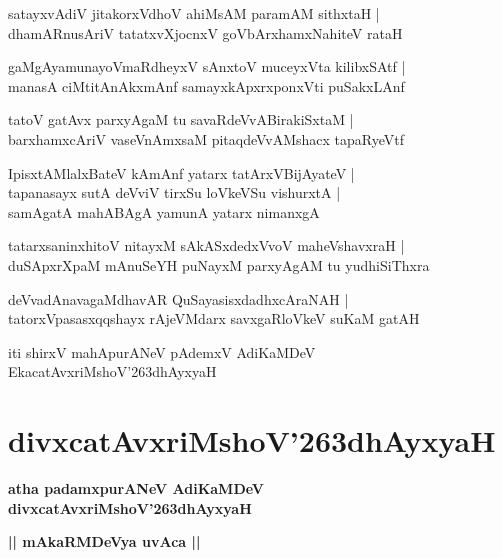 \documentclass[twoside,12pt,openright]{book}
\def\S{\char'263}
\newcounter{shloka}[chapter]
\def\uvaca#1{\centerline{{\large\textbf{#1}}}}
\begin{document}
\begin{shloka}
satayxvAdiV jitakorxVdhoV ahiMsAM paramAM sithxtaH |\\
dhamARnusAriV tatatxvXjocnxV goVbArxhamxNahiteV rataH 
\end{shloka}

\begin{shloka}
gaMgAyamunayoVmaRdheyxV sAnxtoV muceyxVta kilibxSAtf |\\
manasA ciMtitAnAkxmAnf samayxkApxrxponxVti puSakxLAnf 
\end{shloka}

\begin{shloka}
tatoV gatAvx parxyAgaM tu savaRdeVvABirakiSxtaM |\\
barxhamxcAriV vaseVnAmxsaM pitaqdeVvAMshacx tapaRyeVtf 
\end{shloka}

\begin{shloka}
IpisxtAMlalxBateV kAmAnf yatarx tatArxVBijAyateV |\\
tapanasayx sutA deVviV tirxSu loVkeVSu vishurxtA |\\
samAgatA mahABAgA yamunA yatarx nimanxgA 
\end{shloka}

\begin{shloka}
tatarxsaninxhitoV nitayxM sAkASxdedxVvoV maheVshavxraH |\\
duSApxrXpaM mAnuSeYH  puNayxM parxyAgAM tu yudhiSiThxra
\end{shloka}

\begin{shloka}
deVvadAnavagaMdhavAR QuSayasisxdadhxcAraNAH |\\
tatorxVpasasxqqshayx rAjeVMdarx savxgaRloVkeV suKaM gatAH 
\end{shloka}

\begin{center}
iti shirxV mahApurANeV pAdemxV AdiKaMDeV EkacatAvxriMshoV\S dhAyxyaH 
\end{center}

\chapter{divxcatAvxriMshoV\S dhAyxyaH}

\begin{center}
{\LARGE\bfseries atha padamxpurANeV AdiKaMDeV divxcatAvxriMshoV\S dhAyxyaH}
\end{center}

\uvaca{|| mAkaRMDeVya uvAca ||}
\end{document}
